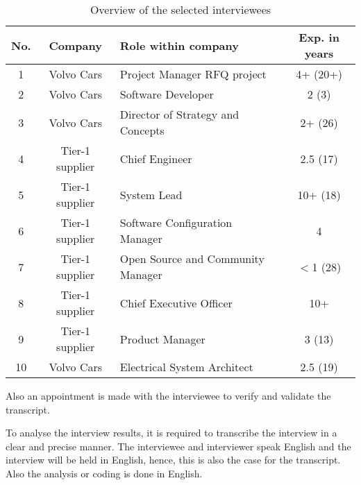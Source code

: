  \begin{table}[htb]
 \centering
 \begin{tabular}{|c|c|p{3.4cm}|c|}\hline
 {\bf No.} & {\bf Company} & {\bf Role within company} & {\bf Exp. in years}\\ \hline
 1 & Volvo Cars & Project Manager RFQ project & 4+ (20+) \\ \hline
 2 & Volvo Cars & Software Developer & 2 (3)\\ \hline
 3 & Volvo Cars & Director of Strategy and Concepts & 2+ (26) \\ \hline
 4 & Tier-1 supplier & Chief Engineer & 2.5 (17)\\ \hline
 5 & Tier-1 supplier & System Lead & 10+ (18) \\ \hline
 6 & Tier-1 supplier & Software Configuration Manager & 4\\ \hline
 7 & Tier-1 supplier & Open Source and Community Manager & $<$1 (28)\\ \hline
 8 & Tier-1 supplier & Chief Executive Officer & 10+\\ \hline
 9 & Tier-1 supplier & Product Manager & 3 (13)\\ \hline
 10 & Volvo Cars & Electrical System Architect & 2.5 (19)\\ \hline
 \end{tabular}
 \caption{Overview of the selected interviewees}
 \label{tab:population}
 \vspace{-.4cm}
 \end{table}

Also an appointment is made with the interviewee to verify and validate the transcript.

 To analyse the interview results, it is required to transcribe the interview in a clear and precise manner. The interviewee and interviewer speak English and the interview will be held in English, hence, this is also the case for the transcript. Also the analysis or coding is done in English.

